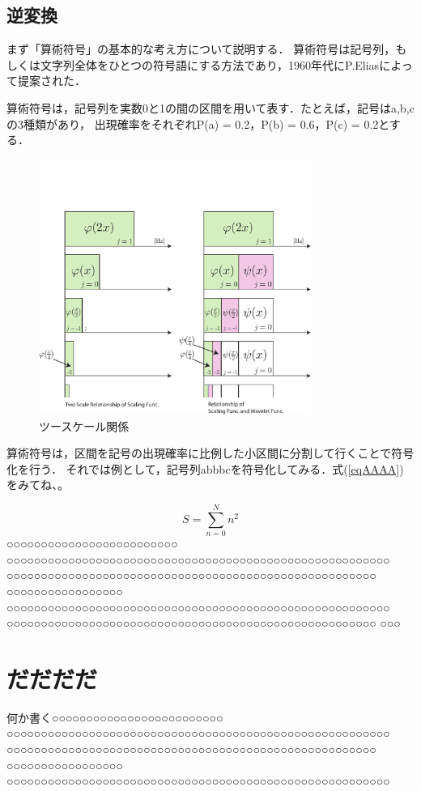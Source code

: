 \subsection{逆変換}\label{QWERT}
まず「算術符号」の基本的な考え方について説明する．
算術符号は記号列，もしくは文字列全体をひとつの符号語にする方法であり，1960年代にP.Eliasによって提案された．\par
算術符号は，記号列を実数0と1の間の区間を用いて表す．たとえば，記号は{a,b,c}の3種類があり，
出現確率をそれぞれP(a) = 0.2，P(b) = 0.6，P(c) = 0.2とする．
\begin{figure}[htbp]
\begin{center}
\includegraphics[width=3.5in]{chap1/fig/two-scale.pdf}
\caption{ツースケール関係} \label{fig-two-scale.pdf}
\end{center}
\end{figure}
算術符号は，区間を記号の出現確率に比例した小区間に分割して行くことで符号化を行う．
それでは例として，記号列abbbcを符号化してみる．式(\ref{eqAAAA})をみてね、。

\begin{equation}
S=\sum_{n=0}^N n^2 \label{eqAAAA}
\end{equation}
○○○○○○○○○○○○○○○○○○○○○○○○○ ○○○○○○○○○○○○○○○○○○○○○○○○○○○○○○○○○○○○○○○○○○○○○○○○○○○○○○○○ ○○○○○○○○○○○○○○○○○○○○○○○○○○○○○○○○○○○○○○○○○○○○○○○○○○○○○○ ○○○○○○○○○○○○○○○○○ ○○○○○○○○○○○○○○○○○○○○○○○○○○○○○○○○○○○○○○○○○○○○○○○○○○○○○○○○ ○○○○○○○○○○○○○○○○○○○○○○○○○○○○○○○○○○○○○○○○○○○○○○○○○○○○○○ ○○○
\section{だだだだ}
何か書く○○○○○○○○○○○○○○○○○○○○○○○○○ ○○○○○○○○○○○○○○○○○○○○○○○○○○○○○○○○○○○○○○○○○○○○○○○○○○○○○○○○ ○○○○○○○○○○○○○○○○○○○○○○○○○○○○○○○○○○○○○○○○○○○○○○○○○○○○○○ ○○○○○○○○○○○○○○○○○ ○○○○○○○○○○○○○○○○○○○○○○○○○○○○○○○○○○○○○○○○○○○○○○○○○○○○○○○○
